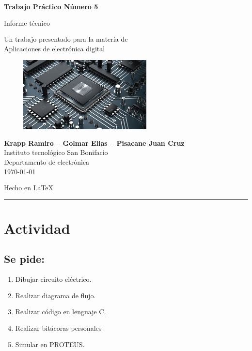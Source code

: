 \documentclass{article}
\renewcommand{\labelenumi}{\alph{enumi})}
\begin{document}
\begin{titlepage}
	 \begin{center}
		 \vspace*{1cm}
				
		 \Huge
		 \textbf{Trabajo Práctico Número 5}
				
		 \vspace{0.3cm}
		 \LARGE
		 Informe técnico	
		 
		 \vspace{0.5cm}
		 \Large
			Un trabajo presentado para la materia de \\
			Aplicaciones de electrónica digital
				
		 \vspace{1.5cm}
		\begin{figure}	[H]
		\centering
		\includegraphics[width=0.6\textwidth]{logo}
		\end{figure}
		\vfill
		 \Large
		 \textbf{Krapp Ramiro -- Golmar Elias -- Pisacane Juan Cruz} \\
		 Instituto tecnológico San Bonifacio\\
		 Departamento de electrónica\\
		 \today
		 
		 \vspace{0.5cm}
		 \large {Hecho en \LaTeX}

	 \end{center}
\end{titlepage}

\setcounter{tocdepth}{3}
\tableofcontents
\noindent\rule{\textwidth}{0.7pt}

\section{Actividad}
	\subsection{Se pide:}
	\renewcommand{\labelenumi}{\alph{enumi})}
	\begin{enumerate}
		\item Dibujar circuito eléctrico. 
		\item Realizar diagrama de flujo. 
		\item Realizar código en lenguaje C. 
		\item Realizar bitácoras personales 
		\item Simular en PROTEUS. 
	\end{enumerate}
		
\end{document}
